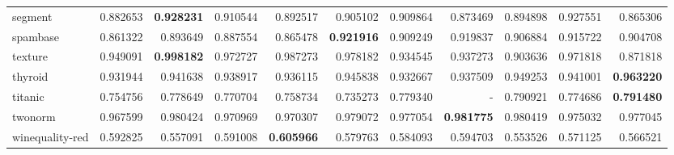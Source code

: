 \begin{tabular}{lrrrrrrrrrr}
segment         &   0.882653 &  \textbf{0.928231} &  0.910544 &  0.892517 &  0.905102 &  0.909864 &  0.873469 &  0.894898 &  0.927551 &  0.865306 \\
spambase        &   0.861322 &  0.893649 &  0.887554 &  0.865478 &  \textbf{0.921916} &  0.909249 &  0.919837 &  0.906884 &  0.915722 &  0.904708 \\
texture         &   0.949091 &  \textbf{0.998182} &  0.972727 &  0.987273 &  0.978182 &  0.934545 &  0.937273 &  0.903636 &  0.971818 &  0.871818 \\
thyroid         &   0.931944 &  0.941638 &  0.938917 &  0.936115 &  0.945838 &  0.932667 &  0.937509 &  0.949253 &  0.941001 &  \textbf{0.963220} \\
titanic         &   0.754756 &  0.778649 &  0.770704 &  0.758734 &  0.735273 &  0.779340 &       - &  0.790921 &  0.774686 &  \textbf{0.791480} \\
twonorm         &   0.967599 &  0.980424 &  0.970969 &  0.970307 &  0.979072 &  0.977054 &  \textbf{0.981775} &  0.980419 &  0.975032 &  0.977045 \\
winequality-red &   0.592825 &  0.557091 &  0.591008 &  \textbf{0.605966} &  0.579763 &  0.584093 &  0.594703 &  0.553526 &  0.571125 &  0.566521 \\
\bottomrule
\end{tabular}
